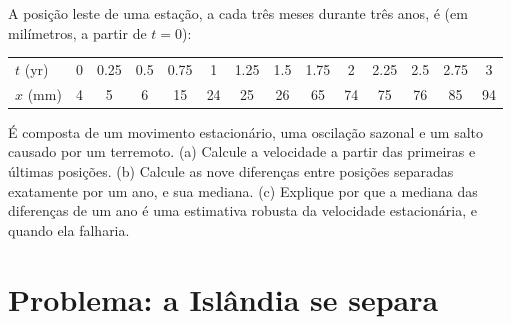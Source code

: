 \begin{exercise}[$\star\star\star$]\label{exo:b1:plate-kinematics:12}
A posição leste de uma estação, a cada três meses durante três anos, é
(em milímetros, a partir de $t = 0$):
\begin{center}\small
\begin{tabular}{l*{13}{c}}
\hline
$t$ (yr) & 0 & 0.25 & 0.5 & 0.75 & 1 & 1.25 & 1.5 & 1.75 & 2 & 2.25 & 2.5 & 2.75 & 3\\
$x$ (mm) & 4 & 5 & 6 & 15 & 24 & 25 & 26 & 65 & 74 & 75 & 76 & 85 & 94\\
\hline
\end{tabular}
\end{center}
É composta de um movimento estacionário, uma oscilação sazonal e um salto causado por um
terremoto. (a) Calcule a velocidade a partir das primeiras e últimas posições.
(b) Calcule as nove diferenças entre posições separadas exatamente por um ano, e
sua mediana. (c) Explique por que a mediana das diferenças de um ano é uma
estimativa robusta da velocidade estacionária, e quando ela falharia.
\end{exercise}

\section{Problema: a Islândia se separa}

